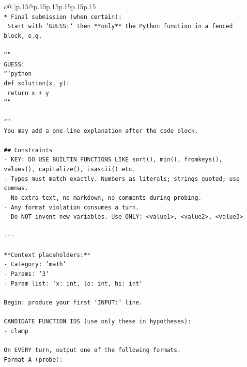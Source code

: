 \documentclass{article}
\begin{document}
{\begin{supertabular}{c@{$\;$}|p{.15\linewidth}@{}p{.15\linewidth}p{.15\linewidth}p{.15\linewidth}p{.15\linewidth}p{.15\linewidth}}
{{{\\ 
\texttt{* Final submission (when certain):} \\
\texttt{  Start with `GUESS:` then **only** the Python function in a fenced block, e.g.} \\
\\ 
\texttt{````} \\
\texttt{GUESS:} \\
\texttt{```python} \\
\texttt{def solution(x, y):} \\
\texttt{    return x + y} \\
\texttt{````} \\
\\ 
\texttt{```} \\
\texttt{You may add a one{-}line explanation after the code block.} \\
\\ 
\texttt{\#\# Constraints} \\
\texttt{{-} KEY: DO USE BUILTIN FUNCTIONS LIKE sort(), min(), fromkeys(), values(), capitalize(), isascii() etc.} \\
\texttt{{-} Types must match exactly. Numbers as literals; strings quoted; use commas.} \\
\texttt{{-} No extra text, no markdown, no comments during probing.} \\
\texttt{{-} Any format violation consumes a turn.} \\
\texttt{{-} Do NOT invent new variables. Use ONLY: <value1>, <value2>, <value3>} \\
\\ 
\texttt{{-}{-}{-}} \\
\\ 
\texttt{**Context placeholders:**} \\
\texttt{{-} Category: `math`} \\
\texttt{{-} Params: `3`} \\
\texttt{{-} Param list: `x: int, lo: int, hi: int`} \\
\\ 
\texttt{Begin: produce your first `INPUT:` line.} \\
\\ 
\texttt{CANDIDATE FUNCTION IDS (use only these in hypotheses):} \\
\texttt{{-} clamp} \\
\\ 
\texttt{On EVERY turn, output one of the following formats.} \\
\texttt{Format A (probe):} \\
}}}
\end{supertabular}}
\end{document}

